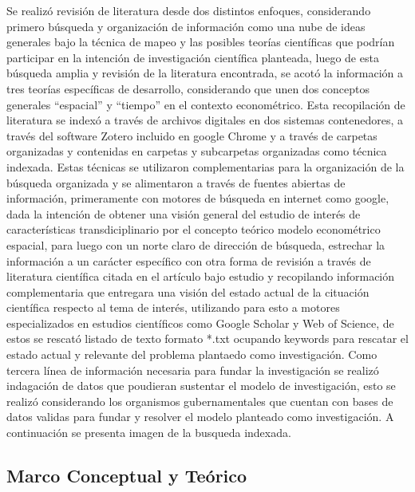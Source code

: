 \documentclass[
  spanish,
  twocolumn]{article}
\begin{document}
Se realizó revisión de literatura desde dos distintos enfoques,
considerando primero búsqueda y organización de información como una
nube de ideas generales bajo la técnica de mapeo y las posibles teorías
científicas que podrían participar en la intención de investigación
científica planteada, luego de esta búsqueda amplia y revisión de la
literatura encontrada, se acotó la información a tres teorías
específicas de desarrollo, considerando que unen dos conceptos generales
``espacial'' y ``tiempo'' en el contexto econométrico. Esta recopilación
de literatura se indexó a través de archivos digitales en dos sistemas
contenedores, a través del software Zotero incluido en google Chrome y a
través de carpetas organizadas y contenidas en carpetas y subcarpetas
organizadas como técnica indexada. Estas técnicas se utilizaron
complementarias para la organización de la búsqueda organizada y se
alimentaron a través de fuentes abiertas de información, primeramente
con motores de búsqueda en internet como google, dada la intención de
obtener una visión general del estudio de interés de características
transdiciplinario por el concepto teórico modelo econométrico espacial,
para luego con un norte claro de dirección de búsqueda, estrechar la
información a un carácter específico con otra forma de revisión a través
de literatura científica citada en el artículo bajo estudio y
recopilando información complementaria que entregara una visión del
estado actual de la cituación científica respecto al tema de interés,
utilizando para esto a motores especializados en estudios científicos
como Google Scholar y Web of Science, de estos se rescató listado de
texto formato *.txt ocupando keywords para rescatar el estado actual y
relevante del problema plantaedo como investigación. Como tercera línea
de información necesaria para fundar la investigación se realizó
indagación de datos que poudieran sustentar el modelo de investigación,
esto se realizó considerando los organismos gubernamentales que cuentan
con bases de datos validas para fundar y resolver el modelo planteado
como investigación. A continuación se presenta imagen de la busqueda
indexada.

\hypertarget{marco-conceptual-y-teuxf3rico}{%
\subsection{Marco Conceptual y
Teórico}\label{marco-conceptual-y-teuxf3rico}}
\end{document}

